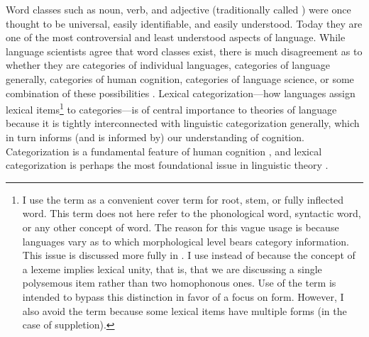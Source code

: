 Word classes such as noun, verb, and adjective (traditionally called ) were once thought to be universal, easily identifiable, and easily understood. Today they are one of the most controversial and least understood aspects of language. While language scientists agree that word classes exist, there is much disagreement as to whether they are categories of individual languages, categories of language generally, categories of human cognition, categories of language science, or some combination of these possibilities \parencites[166]{Mithun2017}{Haspelmath2018}{Hieberfc}. Lexical categorization—how languages assign lexical items\footnote{I use the term  as a convenient cover term for root, stem, or fully inflected word. This term does not here refer to the phonological word, syntactic word, or any other concept of word. The reason for this vague usage is because languages vary as to which morphological level bears category information. This issue is discussed more fully in . I use  instead of  because the concept of a lexeme implies lexical unity, that is, that we are discussing a single polysemous item rather than two homophonous ones. Use of the term  is intended to bypass this distinction in favor of a focus on form. However, I also avoid the term  because some lexical items have multiple forms (in the case of suppletion).} to categories—is of central importance to theories of language because it is tightly interconnected with linguistic categorization generally, which in turn informs (and is informed by) our understanding of cognition. Categorization is a fundamental feature of human cognition \parencites[xi]{Taylor2003}[2--3]{LierRijkhoff2013}, and lexical categorization is perhaps the most foundational issue in linguistic theory \parencites[36]{Croft1991}[1]{VapnarskyVeneziano2017b}.

